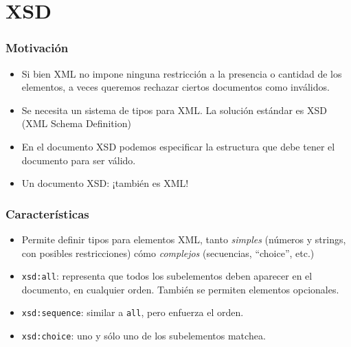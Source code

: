 \section{XSD}

\begin{frame}
\frametitle{Motivación}
\begin{itemize}
\item	Si bien XML no impone ninguna restricción a la presencia o cantidad
	de los elementos, a veces queremos rechazar ciertos documentos
	como inválidos.
	\pause

\item	Se necesita un sistema de tipos para XML. La solución
	estándar es XSD (XML Schema Definition)
	\pause

\item	En el documento XSD podemos especificar la estructura que
	debe tener el documento para ser válido.
	\pause

\item	Un documento XSD: ¡también es XML!
\end{itemize}
\end{frame}

\begin{frame}
\frametitle{Características}
\begin{itemize}
\item	Permite definir tipos para elementos XML, tanto {\it simples}
	(números y strings, con posibles restricciones) cómo
	{\it complejos} (secuencias, ``choice'', etc.)
	\pause

\item	\texttt{xsd:all}: representa que todos los subelementos
	deben aparecer en el documento, en cualquier orden. También
	se permiten elementos opcionales.
	\pause

\item	\texttt{xsd:sequence}: similar a \texttt{all}, pero enfuerza
	el orden.
	\pause

\item	\texttt{xsd:choice}: uno y sólo uno de los subelementos
	matchea.
\end{itemize}
\end{frame}

